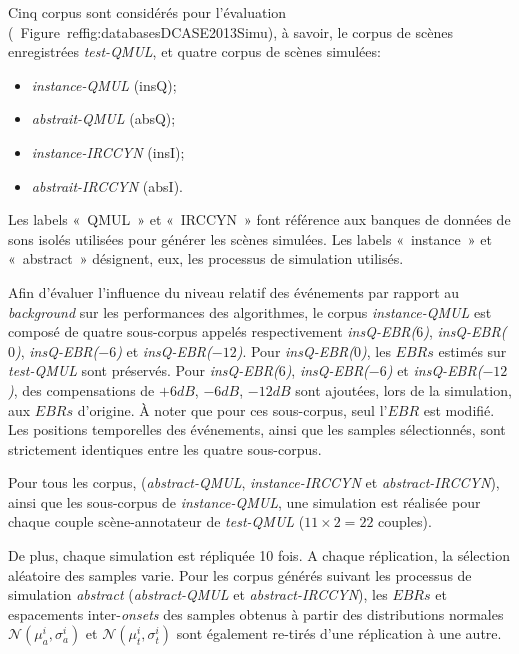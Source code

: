 Cinq corpus sont considérés pour l'évaluation (\cf~Figure~ref{fig:databasesDCASE2013Simu}), à savoir, le corpus de scènes enregistrées \emph{test-QMUL}, et quatre corpus de scènes simulées:

\begin{itemize}
\item \emph{instance-QMUL} (insQ);
\item \emph{abstrait-QMUL} (absQ);
\item \emph{instance-IRCCYN} (insI);
\item \emph{abstrait-IRCCYN} (absI).
\end{itemize}

Les labels «~QMUL~» et «~IRCCYN~» font référence aux banques de données de sons isolés utilisées pour générer les scènes simulées. Les labels «~instance~» et «~abstract~» désignent, eux, les processus de simulation utilisés. 

Afin d'évaluer l'influence du niveau relatif des événements par rapport au \emph{background} sur les performances des algorithmes, le corpus \emph{instance-QMUL} est composé de quatre sous-corpus appelés respectivement \emph{insQ-EBR($6$)}, \emph{insQ-EBR($0$)}, \emph{insQ-EBR($-6$)} et \emph{insQ-EBR($-12$)}. Pour \emph{insQ-EBR($0$)}, les $EBRs$ estimés sur \emph{test-QMUL} sont préservés. Pour \emph{insQ-EBR($6$)}, \emph{insQ-EBR($-6$)} et \emph{insQ-EBR($-12$)}, des compensations de $+6dB$, $-6dB$, $-12dB$ sont ajoutées, lors de la simulation, aux $EBRs$ d'origine. À noter que pour ces sous-corpus, seul l'$EBR$ est modifié. Les positions temporelles des événements, ainsi que les samples sélectionnés, sont strictement identiques entre les quatre sous-corpus.

Pour tous les corpus, (\emph{abstract-QMUL}, \emph{instance-IRCCYN} et \emph{abstract-IRCCYN}), ainsi que les sous-corpus de \emph{instance-QMUL}, une simulation est réalisée pour chaque couple scène-annotateur de \emph{test-QMUL} ($11\times2=22$ couples). 

De plus, chaque simulation est répliquée 10 fois. A chaque réplication, la sélection aléatoire des samples varie. Pour les corpus générés suivant les processus de simulation \emph{abstract} (\emph{abstract-QMUL} et \emph{abstract-IRCCYN}), les $EBRs$ et espacements inter-\emph{onsets} des samples obtenus à partir des distributions normales  $\mathcal{N}(\mu^i_a,\sigma^i_a)$ et $\mathcal{N}(\mu^i_t,\sigma^i_t)$ sont également re-tirés d'une réplication à une autre. 


